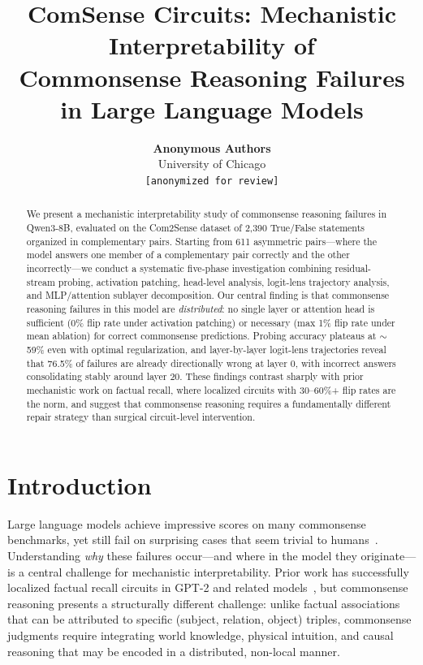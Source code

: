 \documentclass{article}
\title{ComSense Circuits: Mechanistic Interpretability of\\
Commonsense Reasoning Failures in Large Language Models}
\author{%
  \textbf{Anonymous Authors}\\
  University of Chicago\\
  \texttt{[anonymized for review]}
}
\begin{document}
\ifcolmsubmission
\linenumbers
\fi

\maketitle

\begin{abstract}
We present a mechanistic interpretability study of commonsense reasoning failures in Qwen3-8B, evaluated on the Com2Sense dataset of 2,390 True/False statements organized in complementary pairs. Starting from 611 asymmetric pairs—where the model answers one member of a complementary pair correctly and the other incorrectly—we conduct a systematic five-phase investigation combining residual-stream probing, activation patching, head-level analysis, logit-lens trajectory analysis, and MLP/attention sublayer decomposition. Our central finding is that commonsense reasoning failures in this model are \emph{distributed}: no single layer or attention head is sufficient (0\% flip rate under activation patching) or necessary (max 1\% flip rate under mean ablation) for correct commonsense predictions. Probing accuracy plateaus at $\sim$59\% even with optimal regularization, and layer-by-layer logit-lens trajectories reveal that 76.5\% of failures are already directionally wrong at layer 0, with incorrect answers consolidating stably around layer 20. These findings contrast sharply with prior mechanistic work on factual recall, where localized circuits with 30--60\%+ flip rates are the norm, and suggest that commonsense reasoning requires a fundamentally different repair strategy than surgical circuit-level intervention.
\end{abstract}

\section{Introduction}
\label{sec:intro}

Large language models achieve impressive scores on many commonsense benchmarks, yet still fail on surprising cases that seem trivial to humans~\citep{davis2023commonsense}. Understanding \emph{why} these failures occur—and where in the model they originate—is a central challenge for mechanistic interpretability. Prior work has successfully localized factual recall circuits in GPT-2 and related models~\citep{wang2022interpretability, geva2023dissecting, meng2022locating}, but commonsense reasoning presents a structurally different challenge: unlike factual associations that can be attributed to specific (subject, relation, object) triples, commonsense judgments require integrating world knowledge, physical intuition, and causal reasoning that may be encoded in a distributed, non-local manner.
\end{document}
